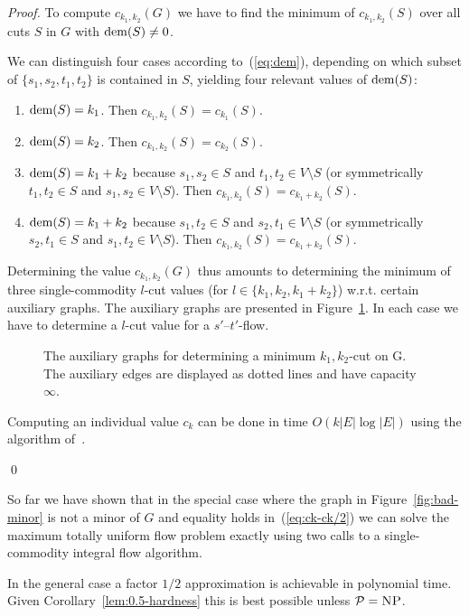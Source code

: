 \begin{proof}
  To compute $c_{k_1,k_2}(G)$ we have to find the minimum of
  $c_{k_1,k_2}(S)$ over all cuts $S$ in $G$ with $\operatorname{dem}(S)\neq 0$.

  We can distinguish four cases according to~(\ref{eq:dem}), depending
  on which subset of $\{s_1,s_2,t_1,t_2\}$ is contained in $S$,
  yielding four relevant values of $\operatorname{dem}(S)$:
  \begin{enumerate}
  \item $\operatorname{dem}(S)=k_1$. Then $c_{k_1,k_2}(S)=c_{k_1}(S)$.
  \item $\operatorname{dem}(S)=k_2$. Then $c_{k_1,k_2}(S)=c_{k_2}(S)$.
  \item $\operatorname{dem}(S)=k_1+k_2$ because $s_1,s_2\in S$ and $t_1,t_2\in
    V\setminus S$ (or symmetrically $t_1,t_2\in S$ and $s_1,s_2\in
    V\setminus S$). Then $c_{k_1,k_2}(S)=c_{k_1+k_2}(S)$.
  \item $\operatorname{dem}(S)=k_1+k_2$ because $s_1,t_2\in S$ and $s_2,t_1\in
    V\setminus S$ (or symmetrically $s_2,t_1\in S$ and $s_1,t_2\in
    V\setminus S$). Then $c_{k_1,k_2}(S)=c_{k_1+k_2}(S)$.
  \end{enumerate}
  Determining the value $c_{k_1,k_2}(G)$ thus amounts to determining
  the minimum of three single-commodity $l$-cut values
  (for $l\in\{k_1,k_2,k_1+k_2\}$) w.r.t. certain auxiliary
  graphs. The auxiliary graphs are presented in
  Figure~\ref{fig:aux-graphs}. In each case we have to determine a
  $l$-cut value for a $s'$--$t'$-flow.
  \begin{figure}
    \centering
    \caption{The auxiliary graphs for determining a minimum
      $k_1,k_2$-cut on G. The auxiliary edges are displayed as dotted
      lines and have capacity $\infty$.}
    \label{fig:aux-graphs}
  \end{figure}

  Computing an individual value $c_k$ can be done in time
  $O(k|E|\log|E|)$ using the algorithm of~\cite{baier-koehler-skutella:05}.

\qed \end{proof}

So far we have shown that in the special case where the graph in
Figure~\ref{fig:bad-minor} is not a minor of $G$ and equality holds
in~(\ref{eq:ck-ck/2}) we can solve the maximum totally
uniform flow problem exactly using two calls to a single-commodity
integral flow algorithm.

In the general case a factor $1/2$ approximation
is achievable in polynomial time. Given
Corollary~\ref{lem:0.5-hardness} this is best possible unless $\mathcal{P}={\text{\textsc{NP}}}$.


